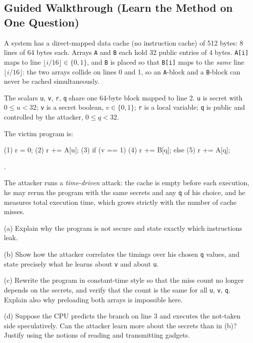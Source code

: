 \documentclass[12pt, a4paper]{article}
\begin{document}
\subsection*{Guided Walkthrough (Learn the Method on One Question)}

\begin{problembox}
A system has a direct-mapped data cache (no instruction cache) of 512 bytes: 8 lines of 64 bytes each. Arrays \texttt{A} and \texttt{B} each hold 32 public entries of 4 bytes. \texttt{A[i]} maps to line $\lfloor i/16 \rfloor \in \{0,1\}$, and \texttt{B} is placed so that \texttt{B[i]} maps to the \emph{same} line $\lfloor i/16 \rfloor$: the two arrays collide on lines 0 and 1, so an \texttt{A}-block and a \texttt{B}-block can never be cached simultaneously.

The scalars \texttt{u}, \texttt{v}, \texttt{r}, \texttt{q} share one 64-byte block mapped to line 2. \texttt{u} is secret with $0 \leq u < 32$; \texttt{v} is a secret boolean, $v \in \{0,1\}$; \texttt{r} is a local variable; \texttt{q} is public and controlled by the attacker, $0 \leq q < 32$.

The victim program is:
\begin{codebox}
(1) r = 0;
(2) r += A[u];
(3) if (v == 1) {
(4)     r += B[q];
} else {
(5)     r += A[q];
}
\end{codebox}.

The attacker runs a \emph{time-driven} attack: the cache is empty before each execution, he may rerun the program with the same secrets and any \texttt{q} of his choice, and he measures total execution time, which grows strictly with the number of cache misses.

(a) Explain why the program is not secure and state exactly which instructions leak.

(b) Show how the attacker correlates the timings over his chosen \texttt{q} values, and state precisely what he learns about \texttt{v} and about \texttt{u}.

(c) Rewrite the program in constant-time style so that the miss count no longer depends on the secrets, and verify that the count is the same for all \texttt{u}, \texttt{v}, \texttt{q}.
Explain also why preloading both arrays is impossible here.

(d) Suppose the CPU predicts the branch on line 3 and executes the not-taken side speculatively.
Can the attacker learn more about the secrets than in (b)? Justify using the notions of reading and transmitting gadgets.
\end{problembox}
\end{document}
